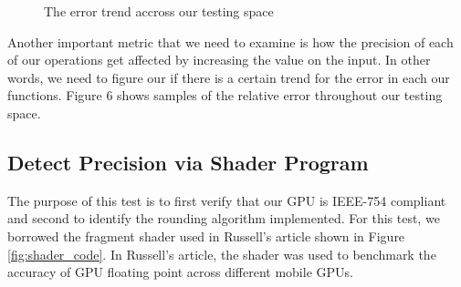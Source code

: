 \begin{figure}[!tbh]
 \centering  
  \caption{The error trend accross our testing space }
   \label{fig:fill_geo3}
\end{figure}

Another important metric that we need to examine is how the precision of each of our operations get affected by increasing the value on the input. In other words, we need to figure our if there is a certain trend for the error in each our functions. Figure 6 shows samples of the relative error throughout our testing space. 



\subsection{Detect Precision via Shader Program}
The purpose of this test is to first verify that our GPU is IEEE-754 compliant and second to identify the rounding algorithm implemented. For this test, we borrowed the fragment shader used in Russell's article \cite{stuart2013mobile} shown in Figure \ref{fig:shader_code}. In Russell's article, the shader was used to benchmark the accuracy of GPU floating point across different mobile GPUs. 

